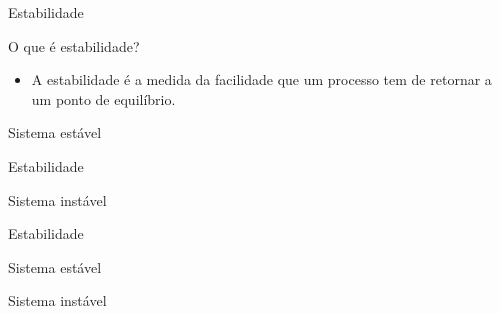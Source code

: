 \begin{frame}{Estabilidade}
	\begin{block}{O que é estabilidade?}
		\begin{itemize}
			\item A estabilidade é a medida da facilidade que um processo tem de retornar a um ponto de equilíbrio.
		\end{itemize}
	\end{block}

	\vspace{0.5cm}
	
	\begin{minipage}{0.49\linewidth}
		\centering
		\scalebox{1}{}
	\end{minipage}
	\hfill
	\begin{minipage}{0.49\linewidth}
		\centering
		\scalebox{1}{}
	\end{minipage}

	\vspace{0.5cm}

	\centering
	
	\Large	
	Sistema estável
\end{frame}


\begin{frame}{Estabilidade}
	\begin{minipage}{0.49\linewidth}
		\centering
		\scalebox{1}{}
	\end{minipage}
	\hfill
	\begin{minipage}{0.49\linewidth}
		\centering
		
		\vspace{-0.7cm}
		\scalebox{1}{}
	\end{minipage}

	\vspace{1cm}

	\centering

	\Large
	Sistema instável
\end{frame}


\begin{frame}{Estabilidade}
	\begin{minipage}{0.49\linewidth}
		\centering
		\scalebox{0.8}{}
		
		\medskip
		
		Sistema estável
	\end{minipage}
	\hfill
	\begin{minipage}{0.49\linewidth}
		\centering
		
		\vspace{1.6cm}
		\scalebox{1.2}{}
		
		\medskip
		
		Sistema instável
	\end{minipage}
	
	\vspace{1cm}
	
	\centering
	
	\Large
	
\end{frame}


